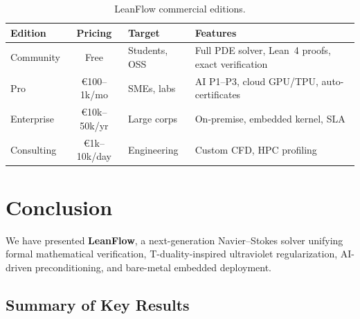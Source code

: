 \documentclass[11pt,a4paper,twoside]{article}
\begin{document}
\begin{table}[H]
\centering
\caption{LeanFlow commercial editions.}
\label{tab:commercial}
\begin{tabularx}{\textwidth}{lcll}
\toprule
\textbf{Edition} & \textbf{Pricing} & \textbf{Target} & \textbf{Features} \\
\midrule
Community & Free & Students, OSS & Full PDE solver, Lean~4 proofs, exact verification \\
Pro & \euro{}100--1k/mo & SMEs, labs & AI P1--P3, cloud GPU/TPU, auto-certificates \\
Enterprise & \euro{}10k--50k/yr & Large corps & On-premise, embedded kernel, SLA \\
Consulting & \euro{}1k--10k/day & Engineering & Custom CFD, HPC profiling \\
\bottomrule
\end{tabularx}
\end{table}

\section{Conclusion}
\label{sec:conclusion}

We have presented \textbf{LeanFlow}, a next-generation Navier--Stokes solver unifying formal mathematical verification, T-duality-inspired ultraviolet regularization, AI-driven preconditioning, and bare-metal embedded deployment.

\subsection{Summary of Key Results}
\end{document}
